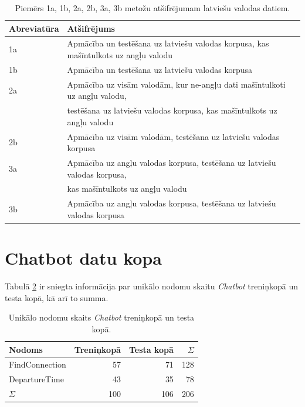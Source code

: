 \begin{table}[htbp]
  \centering
  \caption{Piemērs 1a, 1b, 2a, 2b, 3a, 3b metožu atšifrējumam latviešu valodas datiem.}
    \begin{tabular}{ll}\toprule
    Abreviatūra & Atšifrējums \\\midrule
    1a & Apmācība un testēšana uz latviešu valodas korpusa, kas mašīntulkots uz angļu valodu \\
    1b & Apmācība un testēšana uz latviešu valodas korpusa \\\midrule
    2a & Apmācība uz visām valodām, kur ne-angļu dati mašīntulkoti uz angļu valodu,\\
       & testēšana uz latviešu valodas korpusa, kas mašīntulkots uz angļu valodu \\
    2b & Apmācība uz visām valodām, testēšana uz latviešu valodas korpusa \\\midrule
    3a & Apmācība uz angļu valodas korpusa, testēšana uz latviešu valodas korpusa,\\
       & kas mašīntulkots uz angļu valodu \\
    3b & Apmācība uz angļu valodas korpusa, testēšana uz latviešu valodas korpusa \\\bottomrule
    \end{tabular}%
  \label{tab:legend2}%
\end{table}%



\section{Chatbot datu kopa}

Tabulā \ref{tab:chatbot-labels} ir sniegta informācija par unikālo nodomu skaitu  \textit{Chatbot} treniņkopā un testa kopā, kā arī to summa.

\begin{table}[htbp]
  \centering
  \caption{Unikālo nodomu skaits \textit{Chatbot} treniņkopā un testa kopā.}
    \begin{tabular}{lrrr} \toprule
    Nodoms & Treniņkopā & Testa kopā & $\Sigma$ \\\midrule
    FindConnection & 57    & 71 & 128 \\
    DepartureTime & 43    & 35 & 78 \\
    $\Sigma$ & 100    & 106 & 206 \\\bottomrule
    \end{tabular}%
  \label{tab:chatbot-labels}%
\end{table}%


